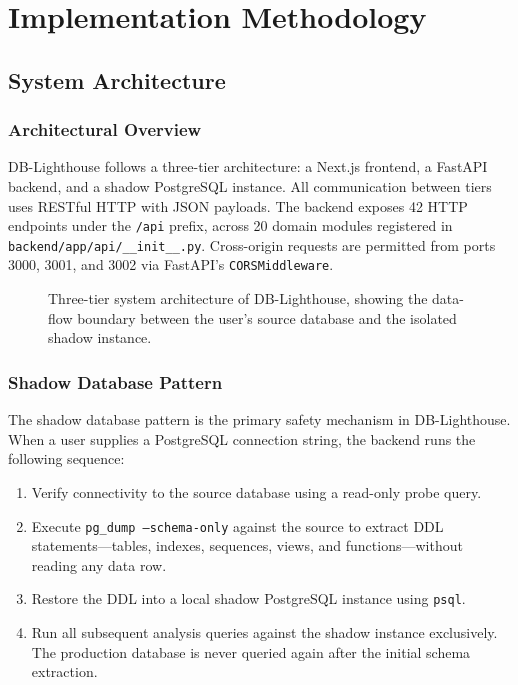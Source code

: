 \documentclass[12pt,a4paper]{report}
\begin{document}
\chapter{Implementation Methodology}

\section{System Architecture}

\subsection{Architectural Overview}

DB-Lighthouse follows a three-tier architecture: a Next.js frontend, a FastAPI backend, and a shadow PostgreSQL instance. All communication between tiers uses RESTful HTTP with JSON payloads. The backend exposes 42 HTTP endpoints under the \texttt{/api} prefix, across 20 domain modules registered in \texttt{backend/app/api/\_\_init\_\_.py}. Cross-origin requests are permitted from ports 3000, 3001, and 3002 via FastAPI's \texttt{CORSMiddleware}.

\begin{figure}[htbp]
    \centering
    \fbox{\rule{0pt}{5cm}\rule{\textwidth}{0pt}}
    \caption{Three-tier system architecture of DB-Lighthouse, showing the data-flow boundary between the user's source database and the isolated shadow instance.}
    \label{fig:architecture}
\end{figure}

\subsection{Shadow Database Pattern}

The shadow database pattern is the primary safety mechanism in DB-Lighthouse. When a user supplies a PostgreSQL connection string, the backend runs the following sequence:

\begin{enumerate}
    \item Verify connectivity to the source database using a read-only probe query.
    \item Execute \texttt{pg\_dump --schema-only} against the source to extract DDL statements---tables, indexes, sequences, views, and functions---without reading any data row.
    \item Restore the DDL into a local shadow PostgreSQL instance using \texttt{psql}.
    \item Run all subsequent analysis queries against the shadow instance exclusively. The production database is never queried again after the initial schema extraction.
\end{enumerate}
\end{document}
